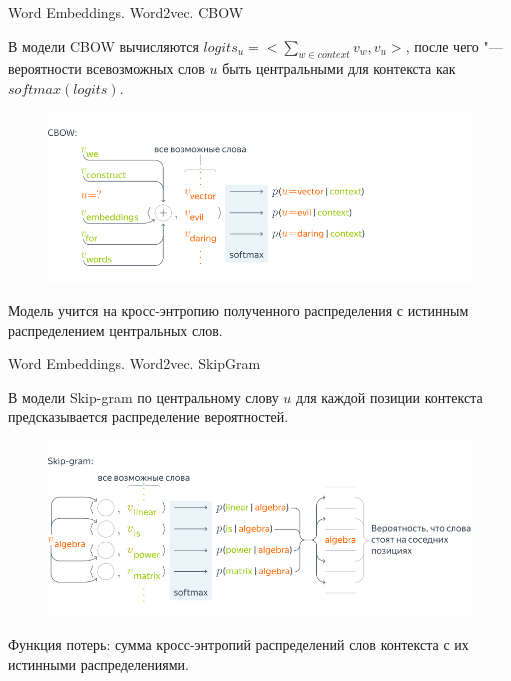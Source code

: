 \documentclass[notheorems, handout, 10pt]{beamer}
\begin{document}
	\begin{frame}{Word Embeddings. Word2vec. CBOW}
		
		В модели CBOW вычисляются $logits_u=<\sum_{w\in context} v_w, v_u>$, после чего "--- вероятности всевозможных слов $u$ быть центральными для контекста как $softmax(logits)$.
		
		\begin{figure}[H]
			\includegraphics[width=0.7\linewidth]{images/cbow}
		\end{figure}
		
		Модель учится на кросс-энтропию полученного распределения с истинным распределением центральных слов.
		
		\note{
			
		}
		
	\end{frame}
	
	\begin{frame}{Word Embeddings. Word2vec. SkipGram}
		
		В модели Skip-gram по центральному слову $u$ для каждой позиции контекста предсказывается распределение вероятностей. 
		
		\begin{figure}[H]
			\includegraphics[width=0.7\linewidth]{images/skipgram}
		\end{figure}
		
		Функция потерь: сумма кросс-энтропий распределений слов контекста с их истинными распределениями.
			
		\note{
	
		}
		
	\end{frame}
	
\end{document}

